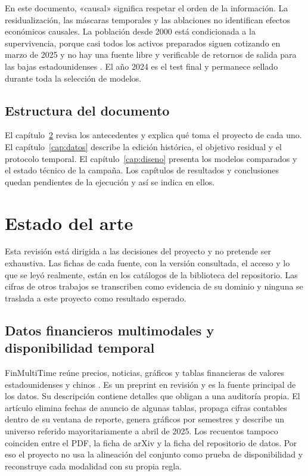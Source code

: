 \documentclass[11pt,a4paper]{report}
\begin{document}
En este documento, «causal» significa respetar el orden de la información. La
residualización, las máscaras temporales y las ablaciones no identifican
efectos económicos causales. La población desde 2000 está condicionada a la
supervivencia, porque casi todos los activos preparados siguen cotizando en
marzo de 2025 y no hay una fuente libre y verificable de retornos de salida
para las bajas estadounidenses \parencite{shumway1997delisting}. El año 2024
es el test final y permanece sellado durante toda la selección de modelos.

\section{Estructura del documento}
El capítulo~\ref{cap:estado} revisa los antecedentes y explica qué toma el
proyecto de cada uno. El capítulo~\ref{cap:datos} describe la edición
histórica, el objetivo residual y el protocolo temporal. El
capítulo~\ref{cap:diseno} presenta los modelos comparados y el estado técnico
de la campaña. Los capítulos de resultados y conclusiones quedan pendientes de
la ejecución y así se indica en ellos.

\chapter{Estado del arte}
\label{cap:estado}
Esta revisión está dirigida a las decisiones del proyecto y no pretende ser
exhaustiva. Las fichas de cada fuente, con la versión consultada, el acceso y
lo que se leyó realmente, están en los catálogos de la biblioteca del
repositorio. Las cifras de otros trabajos se transcriben como evidencia de su
dominio y ninguna se traslada a este proyecto como resultado esperado.

\section{Datos financieros multimodales y disponibilidad temporal}
FinMultiTime reúne precios, noticias, gráficos y tablas financieras de
valores estadounidenses y chinos \parencite{xu2025finmultitime}. Es un
preprint en revisión y es la fuente principal de los datos. Su descripción
contiene detalles que obligan a una auditoría propia. El artículo elimina
fechas de anuncio de algunas tablas, propaga cifras contables dentro de su
ventana de reporte, genera gráficos por semestres y describe un universo
referido mayoritariamente a abril de 2025. Los recuentos tampoco coinciden
entre el PDF, la ficha de arXiv y la ficha del repositorio de datos. Por eso el
proyecto no usa la alineación del conjunto como prueba de disponibilidad y
reconstruye cada modalidad con su propia regla.
\end{document}
